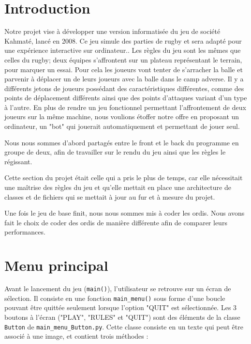 \documentclass[a4paper,12pt]{article}
\begin{document}
\section*{Introduction}
Notre projet vise à développer une version informatisée du jeu de société Kahmaté, lancé en 2008. Ce jeu simule des parties de rugby et sera adapté pour une expérience interactive sur ordinateur.. Les règles du jeu sont les mêmes que celles du rugby; deux équipes s'affrontent sur un plateau représentant le terrain, pour marquer un essai. Pour cela les joueurs vont tenter de s'arracher la balle et parvenir à déplacer un de leurs joueurs avec la balle dans le camp adverse. Il y a différents jetons de joueurs possédant des caractéristiques différentes, comme des points de déplacement différents ainsi que des points d'attaques variant d'un type à l'autre. En plus de rendre un jeu fonctionnel permettant l'affrontement de deux joueurs sur la même machine, nous voulions étoffer notre offre en proposant un ordinateur, un "bot" qui jouerait automatiquement et permettant de jouer seul.

Nous nous sommes d'abord partagés entre le front et le back du programme en groupe de deux, afin de travailler sur le rendu du jeu ainsi que les règles le régissant.

Cette section du projet était celle qui a pris le plus de temps, car elle nécessitait une maîtrise des règles du jeu et qu'elle mettait en place une architecture de classes et de fichiers qui se mettait à jour au fur et à mesure du projet.

Une fois le jeu de base finit, nous nous sommes mis à coder les ordis. Nous avons fait le choix de coder des ordis de manière différente afin de comparer leurs performances.

\section{Menu principal}

Avant le lancement du jeu (\texttt{main()}), l'utilisateur se retrouve sur un écran de sélection. Il consiste en une fonction \texttt{main\_menu()} sous forme d'une boucle pouvant être quittée seulement lorsque l'option "QUIT" est sélectionnée.
Les 3 boutons à l'écran ("PLAY", "RULES" et "QUIT") sont des éléments de la classe \texttt{Button} de \texttt{main\_menu\_Button.py}. Cette classe consiste en un texte qui peut être associé à une image, et contient trois méthodes :
\end{document}
